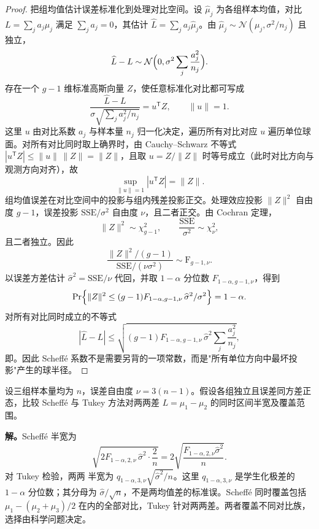 \begin{proof}
把组均值估计误差标准化到处理对比空间。设 $\widehat\mu_j$ 为各组样本均值，对比 $L=\sum_ja_j\mu_j$ 满足 $\sum_ja_j=0$，其估计 $\widehat L=\sum_ja_j\widehat\mu_j$。由 $\widehat\mu_j\sim\mathcal N(\mu_j,\sigma^2/n_j)$ 且独立，
\begin{equation*}
\widehat L-L\sim\mathcal N\Bigl(0,\sigma^2\sum_j\frac{a_j^2}{n_j}\Bigr).
\end{equation*}
存在一个 $g-1$ 维标准高斯向量 $Z$，使任意标准化对比都可写成
\begin{equation*}
\frac{\widehat L-L}
{\sigma\sqrt{\sum_j a_j^2/n_j}}
=u^{\mathsf T}Z,
\qquad
\|u\|=1.
\end{equation*}
这里 $u$ 由对比系数 $a_j$ 与样本量 $n_j$ 归一化决定，遍历所有对比对应 $u$ 遍历单位球面。对所有对比同时取上确界时，由 Cauchy--Schwarz 不等式 $|u^{\mathsf T}Z|\le\|u\|\,\|Z\|=\|Z\|$，且取 $u=Z/\|Z\|$ 时等号成立（此时对比方向与观测方向对齐），故
\begin{equation*}
\sup_{\|u\|=1}|u^{\mathsf T}Z|
=\|Z\|.
\end{equation*}
组均值误差在对比空间中的投影与组内残差投影正交。处理效应投影 $\|Z\|^2$ 自由度 $g-1$，误差投影 $\mathrm{SSE}/\sigma^2$ 自由度 $\nu$，且二者正交。由 Cochran 定理，
\begin{equation*}
\|Z\|^2\sim\chi^2_{g-1},
\qquad
\frac{\mathrm{SSE}}{\sigma^2}\sim\chi^2_\nu,
\end{equation*}
且二者独立。因此
\begin{equation*}
\frac{\|Z\|^2/(g-1)}{\mathrm{SSE}/(\nu\sigma^2)}
\sim\mathrm F_{g-1,\nu}.
\end{equation*}
以误差方差估计 $\widehat\sigma^2=\mathrm{SSE}/\nu$ 代回，并取 $1-\alpha$ 分位数 $F_{1-\alpha,g-1,\nu}$，得到
\begin{equation*}
\Pr\Bigl\{\|Z\|^2\le(g-1)F_{1-\alpha,g-1,\nu}\,\widehat\sigma^2/\sigma^2\Bigr\}=1-\alpha.
\end{equation*}
对所有对比同时成立的不等式
\begin{equation*}
|\widehat L-L|
\le\sqrt{(g-1)F_{1-\alpha,g-1,\nu}\,\widehat\sigma^2\sum_j\frac{a_j^2}{n_j}},
\end{equation*}
即。因此 Scheffé 系数不是需要另背的一项常数，而是"所有单位方向中最坏投影"产生的球半径。
\end{proof}

\begin{workedexample}
设三组样本量均为 $n$，误差自由度 $\nu=3(n-1)$。假设各组独立且误差同方差正态，比较 Scheffé 与 Tukey 方法对两两差 $L=\mu_1-\mu_2$ 的同时区间半宽及覆盖范围。

\textbf{解。}Scheffé 半宽为
\[
\sqrt{2F_{1-\alpha,2,\nu}\,\widehat\sigma^2\cdot\frac2n}
=2\sqrt{\frac{F_{1-\alpha,2,\nu}\widehat\sigma^2}{n}}.
\]
对 Tukey 检验，两两 半宽为 $q_{1-\alpha,3,\nu}\sqrt{\widehat\sigma^2/n}$。这里 $q_{1-\alpha,3,\nu}$ 是学生化极差的 $1-\alpha$ 分位数；其分母为 $\widehat\sigma/\sqrt n$，不是两均值差的标准误。Scheffé 同时覆盖包括 $\mu_1-(\mu_2+\mu_3)/2$ 在内的全部对比，Tukey 针对两两差。两者覆盖不同对比族，选择由科学问题决定。
\end{workedexample}

